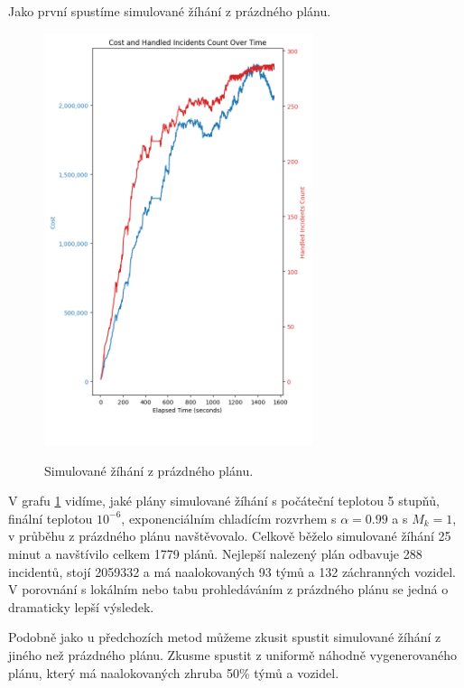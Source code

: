 Jako první spustíme simulované žíhání z prázdného plánu.

\begin{figure}[H]
  \caption{Simulované žíhání z prázdného plánu.}
  \includegraphics[width=0.7\textwidth,height=0.9\textwidth]{img/plots/sa_empty.png}
  \centering
  \label{img:sa_empty}
\end{figure}

V grafu \ref{img:sa_empty} vidíme, jaké plány simulované žíhání
s počáteční teplotou 5 stupňů, finální teplotou $10^{-6}$, exponenciálním chladícím rozvrhem s $\alpha = 0.99$ a s $M_k = 1$,
v průběhu z prázdného plánu navštěvovalo.
Celkově běželo simulované žíhání 25 minut a navštívilo celkem 1779 plánů.
Nejlepší nalezený plán odbavuje 288 incidentů, stojí 2059332 a má naalokovaných 93 týmů a 132 záchranných vozidel.
V porovnání s lokálním nebo tabu prohledáváním z prázdného plánu se jedná o dramaticky lepší výsledek.

Podobně jako u předchozích metod můžeme zkusit spustit simulované žíhání z jiného než prázdného plánu.
Zkusme spustit z uniformě náhodně vygenerovaného plánu, který má naalokovaných zhruba 50\% týmů a vozidel.


